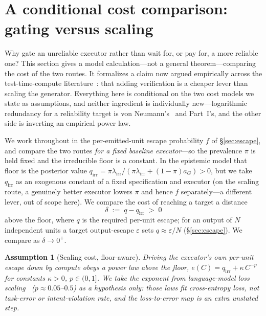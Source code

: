 \documentclass[11pt]{article}
\newtheorem{assumption}{Assumption}
\theoremstyle{definition}
\theoremstyle{remark}
\newcommand{\lirr}{\lambda_{\mathrm{irr}}}
\newcommand{\fesc}{f}
\begin{document}
\section{A conditional cost comparison: gating versus scaling}\label{sec:cost}
Why gate an unreliable executor rather than wait for, or pay for, a more reliable one? This section
gives a model calculation---not a general theorem---comparing the cost of the two routes. It
formalizes a claim now argued empirically across the test-time-compute
literature~\cite{snell2024,lifshitz2025,scalingverif2026}: that adding verification is a cheaper lever
than scaling the generator. Everything here is conditional on the two cost models we state as
assumptions, and neither ingredient is individually new---logarithmic redundancy for a reliability
target is von Neumann's~\cite{vonneumann1956} and Part~I's, and the other side is inverting an
empirical power law.

We work throughout in the per-emitted-unit escape probability $\fesc$ of \S\ref{sec:escape}, and compare
the two routes \emph{for a fixed baseline executor}---so the prevalence $\pi$ is held fixed and the
irreducible floor is a constant. In the epistemic model that floor is the posterior value
$q_{\mathrm{irr}}=\pi\lirr/(\pi\lirr+(1-\pi)a_G)>0$, but we take $q_{\mathrm{irr}}$ as an exogenous
constant of a fixed specification and executor (on the scaling route, a genuinely better executor lowers
$\pi$ and hence $\fesc$ separately---a different lever, out of scope here). We compare the cost of
reaching a target a distance
\[
\delta\;:=\;q-q_{\mathrm{irr}}\;>\;0
\]
above the floor, where $q$ is the required per-unit escape; for an output of $N$ independent units a
target output-escape $\varepsilon$ sets $q\approx\varepsilon/N$ (\S\ref{sec:escape}). We compare as
$\delta\to0^+$.

\begin{assumption}[Scaling cost, floor-aware]\label{ass:det}
Driving the executor's own per-unit escape down by compute obeys a power law above the floor,
$e(C)=q_{\mathrm{irr}}+\kappa\,C^{-p}$ for constants $\kappa>0$, $p\in(0,1]$. We take the exponent from
language-model \emph{loss} scaling~\cite{kaplan2020,hoffmann2022} ($p\approx0.05$--$0.5$) as a
\emph{hypothesis only}: those laws fit cross-entropy loss, not task-error or intent-violation rate, and
the loss-to-error map is an extra unstated step.
\end{assumption}
\end{document}
